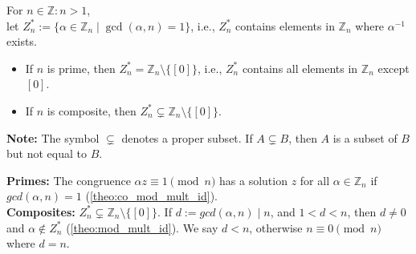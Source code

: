 \begin{theo}

    For $n\in\mathbb{Z}:n>1$,\\
    let $Z_n^*:=\{\alpha\in\mathbb{Z}_n\mid \gcd(\alpha,n)=1\}$, i.e., $Z_n^*$ contains elements in $\mathbb{Z}_n$ where $\alpha^{-1}$ exists.
\begin{itemize}
    \item If $n$ is prime, then $Z_n^*=\mathbb{Z}_n\setminus\{[0]\}$, i.e., $Z_n^*$ contains all elements in $\mathbb{Z}_n$ except $[0]$.
    \item If $n$ is composite, then $Z_n^*\subsetneq\mathbb{Z}_n\setminus \{[0]\}$.
\end{itemize}
\end{theo}
\begin{Note}
    \textbf{Note:} The symbol $\subsetneq$ denotes a proper subset. If $A\subsetneq B$, then $A$ is a subset of $B$ but not equal to $B$.
\end{Note}
\newpage

\noindent
\begin{Proof}

\textbf{Primes:} The congruence $\alpha z \equiv 1\pmod{n}$ has a solution $z$ for all $\alpha\in\mathbb{Z}_n$ if $gcd(\alpha,n)=1$ (\ref{theo:co_mod_mult_id}).\\

\noindent
\textbf{Composites:} $Z_n^*\subsetneq\mathbb{Z}_n\setminus\{[0]\}$. If $d:=gcd(\alpha,n)\mid n$, and $1<d<n$, then $d\neq0$ and $\alpha\notin Z_n^*$ (\ref{theo:mod_mult_id}).
We say $d<n$, otherwise $n\equiv 0\pmod{n}$ where $d=n$.

\end{Proof}

